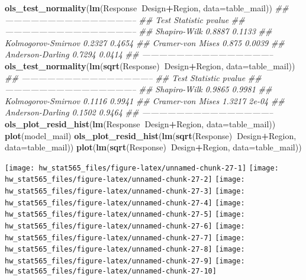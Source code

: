 \documentclass[]{article}
\newenvironment{Shaded}{\begin{snugshade}}{\end{snugshade}}
\newcommand{\CommentTok}[1]{\textcolor[rgb]{0.56,0.35,0.01}{\textit{#1}}}
\newcommand{\DataTypeTok}[1]{\textcolor[rgb]{0.13,0.29,0.53}{#1}}
\newcommand{\KeywordTok}[1]{\textcolor[rgb]{0.13,0.29,0.53}{\textbf{#1}}}
\newcommand{\NormalTok}[1]{#1}
\newcommand{\OperatorTok}[1]{\textcolor[rgb]{0.81,0.36,0.00}{\textbf{#1}}}
\begin{document}
\begin{Shaded}
\begin{Highlighting}[]
\KeywordTok{ols_test_normality}\NormalTok{(}\KeywordTok{lm}\NormalTok{(Response}\OperatorTok{~}\NormalTok{Design}\OperatorTok{+}\NormalTok{Region, }\DataTypeTok{data=}\NormalTok{table_mail))}
\CommentTok{## -----------------------------------------------}
\CommentTok{##        Test             Statistic       pvalue  }
\CommentTok{## -----------------------------------------------}
\CommentTok{## Shapiro-Wilk              0.8887         0.1133 }
\CommentTok{## Kolmogorov-Smirnov        0.2327         0.4654 }
\CommentTok{## Cramer-von Mises          0.875          0.0039 }
\CommentTok{## Anderson-Darling          0.7294         0.0414 }
\CommentTok{## -----------------------------------------------}
\KeywordTok{ols_test_normality}\NormalTok{(}\KeywordTok{lm}\NormalTok{(}\KeywordTok{sqrt}\NormalTok{(Response)}\OperatorTok{~}\NormalTok{Design}\OperatorTok{+}\NormalTok{Region, }\DataTypeTok{data=}\NormalTok{table_mail))}
\CommentTok{## -----------------------------------------------}
\CommentTok{##        Test             Statistic       pvalue  }
\CommentTok{## -----------------------------------------------}
\CommentTok{## Shapiro-Wilk              0.9865         0.9981 }
\CommentTok{## Kolmogorov-Smirnov        0.1116         0.9941 }
\CommentTok{## Cramer-von Mises          1.3217          2e-04 }
\CommentTok{## Anderson-Darling          0.1502         0.9464 }
\CommentTok{## -----------------------------------------------}
\KeywordTok{ols_plot_resid_hist}\NormalTok{(}\KeywordTok{lm}\NormalTok{(Response}\OperatorTok{~}\NormalTok{Design}\OperatorTok{+}\NormalTok{Region, }\DataTypeTok{data=}\NormalTok{table_mail))}
\KeywordTok{plot}\NormalTok{(model_mail)}
\KeywordTok{ols_plot_resid_hist}\NormalTok{(}\KeywordTok{lm}\NormalTok{(}\KeywordTok{sqrt}\NormalTok{(Response)}\OperatorTok{~}\NormalTok{Design}\OperatorTok{+}\NormalTok{Region, }\DataTypeTok{data=}\NormalTok{table_mail))}
\KeywordTok{plot}\NormalTok{(}\KeywordTok{lm}\NormalTok{(}\KeywordTok{sqrt}\NormalTok{(Response)}\OperatorTok{~}\NormalTok{Design}\OperatorTok{+}\NormalTok{Region, }\DataTypeTok{data=}\NormalTok{table_mail))}
\end{Highlighting}
\end{Shaded}

\texttt{[image: hw\_stat565\_files/figure-latex/unnamed-chunk-27-1]}
\texttt{[image: hw\_stat565\_files/figure-latex/unnamed-chunk-27-2]}
\texttt{[image: hw\_stat565\_files/figure-latex/unnamed-chunk-27-3]}
\texttt{[image: hw\_stat565\_files/figure-latex/unnamed-chunk-27-4]}
\texttt{[image: hw\_stat565\_files/figure-latex/unnamed-chunk-27-5]}
\texttt{[image: hw\_stat565\_files/figure-latex/unnamed-chunk-27-6]}
\texttt{[image: hw\_stat565\_files/figure-latex/unnamed-chunk-27-7]}
\texttt{[image: hw\_stat565\_files/figure-latex/unnamed-chunk-27-8]}
\texttt{[image: hw\_stat565\_files/figure-latex/unnamed-chunk-27-9]}
\texttt{[image: hw\_stat565\_files/figure-latex/unnamed-chunk-27-10]}
\end{document}
